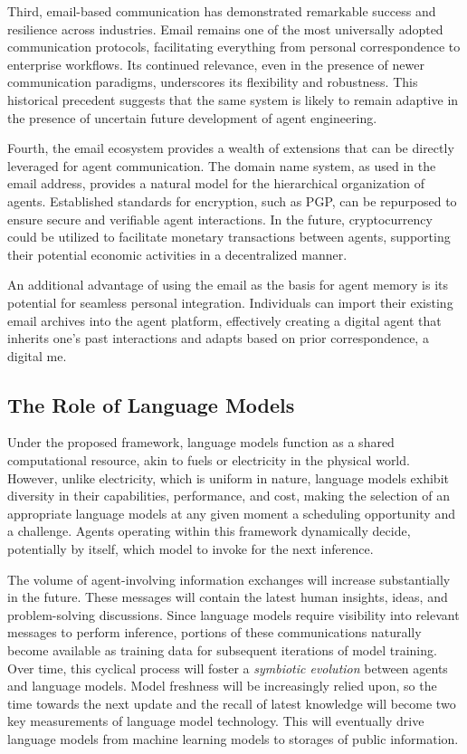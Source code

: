 Third, email-based communication has demonstrated remarkable success and resilience across industries. Email remains one of the most universally adopted communication protocols, facilitating everything from personal correspondence to enterprise workflows. Its continued relevance, even in the presence of newer communication paradigms, underscores its flexibility and robustness. This historical precedent suggests that the same system is likely to remain adaptive in the presence of uncertain future development of agent engineering.

Fourth, the email ecosystem provides a wealth of extensions that can be directly leveraged for agent communication.
The domain name system, as used in the email address, provides
a natural model for the hierarchical organization of agents.
Established standards for encryption, such as PGP, can be repurposed to ensure secure and verifiable agent
interactions.   In the future,
cryptocurrency could be utilized to facilitate
monetary transactions between agents, supporting their potential economic
activities in a decentralized manner.

An additional advantage of using the email as the basis for agent memory is its potential for seamless personal integration. Individuals can import their existing email archives into the agent platform, effectively creating a digital agent that inherits one's past interactions and adapts based on prior correspondence, a digital me.

\subsection{The Role of Language Models}

Under the proposed framework, language models function as a shared computational resource, akin to fuels or electricity in the physical world. However, unlike electricity, which is uniform in nature, language models exhibit diversity in their capabilities, performance, and cost, making the selection of an appropriate language models at any given moment a scheduling opportunity and a challenge. Agents operating within this framework dynamically decide, potentially by itself, which model to invoke for the next inference.

The volume of agent-involving information exchanges will increase substantially in the future. These messages will contain the latest human insights, ideas, and problem-solving discussions. Since language models require visibility into relevant messages to perform inference, portions of these communications naturally become available as training data for subsequent iterations of model training. Over time, this cyclical process will foster a \emph{symbiotic evolution} between agents and language models.  Model freshness will be increasingly relied upon, so the time towards the next update and the recall of latest knowledge will become two key measurements of language model technology.  This will eventually drive language models from machine learning models to storages of public information.

